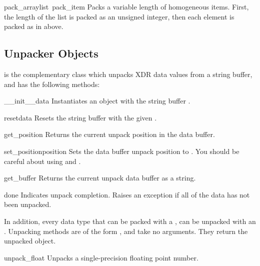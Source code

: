 \begin{funcdesc}{pack_array}{list\, pack_item}
Packs a variable length  of homogeneous items.  First, the
length of the list is packed as an unsigned integer, then each element
is packed as in  above.
\end{funcdesc}

\subsection{Unpacker Objects}

 is the complementary class which unpacks XDR data
values from a string buffer, and has the following methods:

\begin{funcdesc}{__init__}{data}
Instantiates an  object with the string buffer
.
\end{funcdesc}

\begin{funcdesc}{reset}{data}
Resets the string buffer with the given .
\end{funcdesc}

\begin{funcdesc}{get_position}{}
Returns the current unpack position in the data buffer.
\end{funcdesc}

\begin{funcdesc}{set_position}{position}
Sets the data buffer unpack position to .  You should be
careful about using  and .
\end{funcdesc}

\begin{funcdesc}{get_buffer}{}
Returns the current unpack data buffer as a string.
\end{funcdesc}

\begin{funcdesc}{done}{}
Indicates unpack completion.  Raises an  exception
if all of the data has not been unpacked.
\end{funcdesc}

In addition, every data type that can be packed with a ,
can be unpacked with an .  Unpacking methods are of the
form , and take no arguments.  They return the
unpacked object.

\begin{funcdesc}{unpack_float}{}
Unpacks a single-precision floating point number.
\end{funcdesc}

